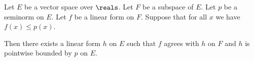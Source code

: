 %
%


\begin{theorem}
  Let $E$ be a vector space over $\reals$.
  Let $F$ be a subspace of $E$.
  Let $p$ be a seminorm on $E$.
  Let $f$ be a linear form on $F$.
  Suppose that for all $x$ we have $f(x) ≤ p(x)$.

  Then there exists a linear form $h$ on $E$
  such that $f$ agrees with $h$ on $F$
  and $h$ is pointwise bounded by $p$ on $E$.
\end{theorem}
